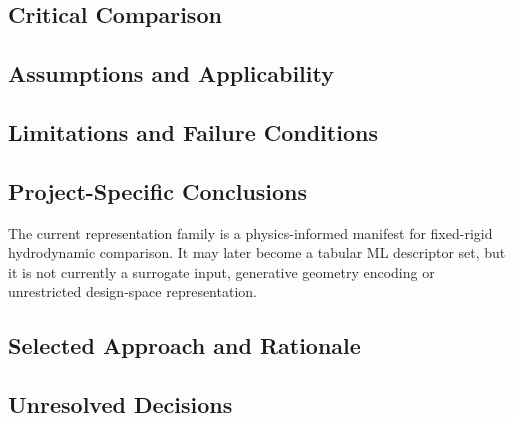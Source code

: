 \subsection{Critical Comparison}
\label{sec:res-ml-rep-critical-comparison}


\subsection{Assumptions and Applicability}
\label{sec:res-ml-rep-assumptions}


\subsection{Limitations and Failure Conditions}
\label{sec:res-ml-rep-limitations}


\subsection{Project-Specific Conclusions}
\label{sec:res-ml-rep-conclusions}

The current representation family is a physics-informed manifest for
fixed-rigid hydrodynamic comparison. It may later become a tabular ML
descriptor set, but it is not currently a surrogate input, generative
geometry encoding or unrestricted design-space representation.

\subsection{Selected Approach and Rationale}
\label{sec:res-ml-rep-selected-approach}


\subsection{Unresolved Decisions}
\label{sec:res-ml-rep-unresolved-decisions}

